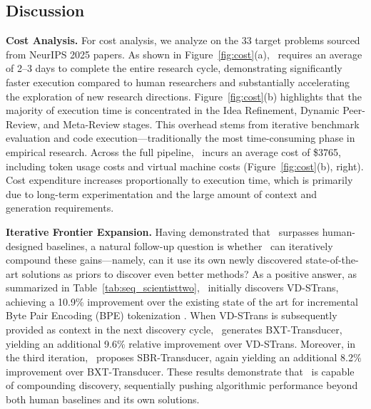 \subsection{Discussion}\label{subsec:discussion}


\noindent\textbf{Cost Analysis.} For cost analysis, we analyze on the 33 target problems sourced from NeurIPS 2025 papers. As shown in Figure~\ref{fig:cost}(a), \sname~requires an average of 2--3 days to complete the entire research cycle, demonstrating significantly faster execution compared to human researchers and substantially accelerating the exploration of new research directions. Figure~\ref{fig:cost}(b) highlights that the majority of execution time is concentrated in the Idea Refinement, Dynamic Peer-Review, and Meta-Review stages. This overhead stems from iterative benchmark evaluation and code execution—traditionally the most time-consuming phase in empirical research. Across the full pipeline, \sname~incurs an average cost of \$3765, including token usage costs and virtual machine costs (Figure~\ref{fig:cost}(b), right). Cost expenditure increases proportionally to execution time, which is primarily due to long-term experimentation and the large amount of context and generation requirements.


\noindent\textbf{Iterative Frontier Expansion.}
Having demonstrated that \sname~surpasses human-designed baselines, a natural follow-up question is whether \sname~can iteratively compound these gains—namely, can it use its own newly discovered state-of-the-art solutions as priors to discover even better methods? 
As a positive answer, as summarized in Table~\ref{tab:seq_scientisttwo}, \sname~initially discovers VD-STrans, achieving a 10.9\% improvement over the existing state of the art for incremental Byte Pair Encoding (BPE) tokenization \citep{jiang2026incremental}. When VD-STrans is subsequently provided as context in the next discovery cycle, \sname~generates BXT-Transducer, yielding an additional 9.6\% relative improvement over VD-STrans. Moreover, in the third iteration, \sname~proposes SBR-Transducer, again yielding an additional 8.2\% improvement over BXT-Transducer. These results demonstrate that \sname~is capable of compounding discovery, sequentially pushing algorithmic performance beyond both human baselines and its own solutions.


